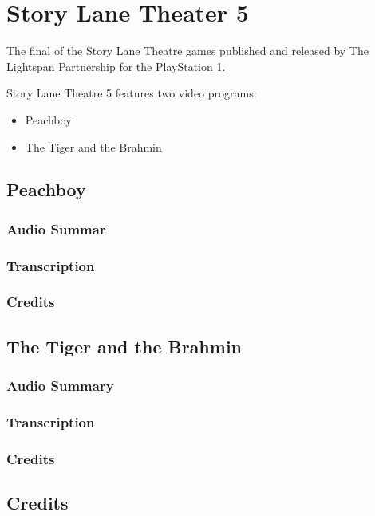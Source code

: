 \chapter{Story Lane Theater 5}


The final of the Story Lane Theatre games published and released by The Lightspan Partnership for the PlayStation 1.

Story Lane Theatre 5 features two video programs:

\begin{itemize}
    \item Peachboy
    \item The Tiger and the Brahmin
\end{itemize}

\clearpage
\newpage

\section{Peachboy}

\subsection{Audio Summar}

\subsection{Transcription}

\subsection{Credits}

\section{The Tiger and the Brahmin}

\subsection{Audio Summary}

\subsection{Transcription}

\subsection{Credits}

\section{Credits}